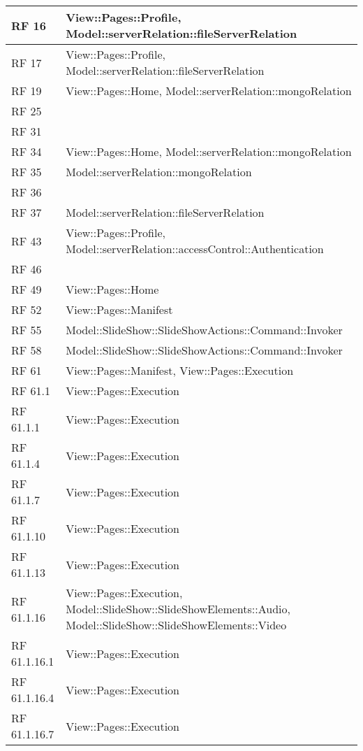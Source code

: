 {\begin{longtable} [c]{| p{2cm} | p{13cm} |}
 \hline 
RF 16 & View::\-Pages::\-Profile, Model::\-serverRelation::\-fileServerRelation\\ 
 \hline 
RF 17 & View::\-Pages::\-Profile, Model::\-serverRelation::\-fileServerRelation\\ 
 \hline 
RF 19 & View::\-Pages::\-Home, Model::\-serverRelation::\-mongoRelation\\ 
 \hline 
RF 25 & \\ 
 \hline 
RF 31 & \\ 
 \hline 
RF 34 & View::\-Pages::\-Home, Model::\-serverRelation::\-mongoRelation\\ 
 \hline 
RF 35 & Model::\-serverRelation::\-mongoRelation\\ 
 \hline 
RF 36 & \\ 
 \hline 
RF 37 & Model::\-serverRelation::\-fileServerRelation\\ 
 \hline 
RF 43 & View::\-Pages::\-Profile, Model::\-serverRelation::\-accessControl::\-Authentication\\ 
 \hline 
RF 46 & \\ 
 \hline 
RF 49 & View::\-Pages::\-Home\\ 
 \hline 
RF 52 & View::\-Pages::\-Manifest\\ 
 \hline 
RF 55 & Model::\-SlideShow::\-SlideShowActions::\-Command::\-Invoker\\ 
 \hline 
RF 58 & Model::\-SlideShow::\-SlideShowActions::\-Command::\-Invoker\\ 
 \hline 
RF 61 & View::\-Pages::\-Manifest, View::\-Pages::\-Execution\\ 
 \hline 
RF 61.1 & View::\-Pages::\-Execution\\ 
 \hline 
RF 61.1.1 & View::\-Pages::\-Execution\\ 
 \hline 
RF 61.1.4 & View::\-Pages::\-Execution\\ 
 \hline 
RF 61.1.7 & View::\-Pages::\-Execution\\ 
 \hline 
RF 61.1.10 & View::\-Pages::\-Execution\\ 
 \hline 
RF 61.1.13 & View::\-Pages::\-Execution\\ 
 \hline 
RF 61.1.16 & View::\-Pages::\-Execution, Model::\-SlideShow::\-SlideShowElements::\-Audio, Model::\-SlideShow::\-SlideShowElements::\-Video\\ 
 \hline 
RF 61.1.16.1 & View::\-Pages::\-Execution\\ 
 \hline 
RF 61.1.16.4 & View::\-Pages::\-Execution\\ 
 \hline 
RF 61.1.16.7 & View::\-Pages::\-Execution\\ 

\end{longtable}}
